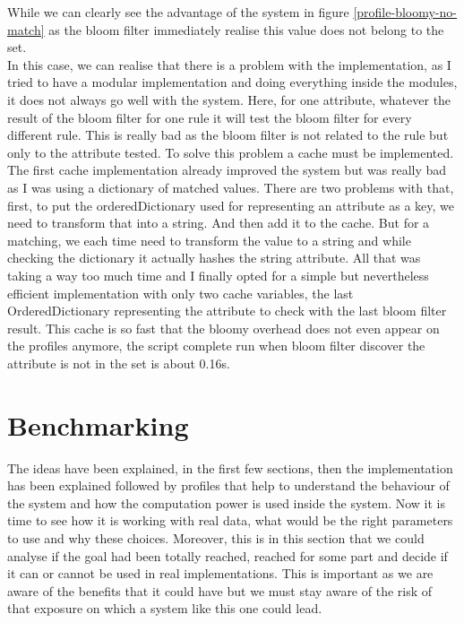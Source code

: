 \documentclass{eplmastersthesis}
\begin{document}
While we can clearly see the advantage of the system in figure \ref{profile-bloomy-no-match} as the bloom filter immediately realise this value does not belong to the set.\\

In this case, we can realise that there is a problem with the implementation, as I tried to have a modular implementation and doing everything inside the modules, it does not always go well with the system. Here, for one attribute, whatever the result of the bloom filter for one rule it will test the bloom filter for every different rule. This is really bad as the bloom filter is not related to the rule but only to the attribute tested. To solve this problem a cache must be implemented. The first cache implementation already improved the system but was really bad as I was using a dictionary of matched values.
There are two problems with that, first, to put the orderedDictionary used for representing an attribute as a key, we need to transform that into a string. And then add it to the cache.
But for a matching, we each time need to transform the value to a string and while checking the dictionary it actually hashes the string attribute. All that was taking a way too much time and I finally opted for a simple but nevertheless efficient implementation with only two cache variables, the last OrderedDictionary representing the attribute to check with the last bloom filter result.
This cache is so fast that the bloomy overhead does not even appear on the profiles anymore, the script complete run when bloom filter discover the attribute is not in the set is about 0.16s.\\

\section{Benchmarking}
\label{sec:Benchmark}
The ideas have been explained, in the first few sections, then the implementation has been explained followed by profiles that help to understand the behaviour of the system and how the computation power is used inside the system. Now it is time to see how it is working with real data, what would be the right parameters to use and why these choices. Moreover, this is in this section that we could analyse if the goal had been totally reached, reached for some part and decide if it can or cannot be used in real implementations.
This is important as we are aware of the benefits that it could have but we must stay aware of the risk of that exposure on which a system like this one could lead.\\
\end{document}
